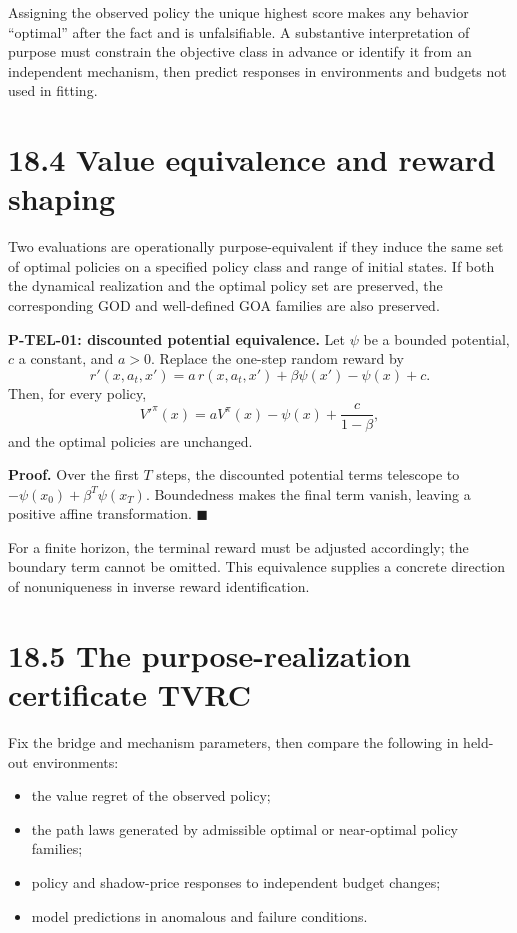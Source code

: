 \documentclass[
  english,
  11pt,
  oneside]{book}
\providecommand{\tightlist}{%
  \setlength{\itemsep}{0pt}\setlength{\parskip}{0pt}}
\begin{document}
Assigning the observed policy the unique highest score makes any behavior ``optimal'' after the fact and is unfalsifiable. A substantive interpretation of purpose must constrain the objective class in advance or identify it from an independent mechanism, then predict responses in environments and budgets not used in fitting.

\section{18.4 Value equivalence and reward shaping}\label{value-equivalence-and-reward-shaping}

Two evaluations are operationally purpose-equivalent if they induce the same set of optimal policies on a specified policy class and range of initial states. If both the dynamical realization and the optimal policy set are preserved, the corresponding GOD and well-defined GOA families are also preserved.

\hypertarget{p-tel-01}{}\label{p-tel-01}

\textbf{P-TEL-01: discounted potential equivalence.} Let \(\psi\) be a bounded potential, \(c\) a constant, and \(a>0\). Replace the one-step random reward by \[r'(x,a_t,x')=a\,r(x,a_t,x')+\beta\psi(x')-\psi(x)+c.\] Then, for every policy, \[V'^\pi(x)=aV^\pi(x)-\psi(x)+\frac c{1-\beta},\] and the optimal policies are unchanged.

\textbf{Proof.} Over the first \(T\) steps, the discounted potential terms telescope to \(-\psi(x_0)+\beta^T\psi(x_T)\). Boundedness makes the final term vanish, leaving a positive affine transformation. \(\blacksquare\)

For a finite horizon, the terminal reward must be adjusted accordingly; the boundary term cannot be omitted. This equivalence supplies a concrete direction of nonuniqueness in inverse reward identification.

\section{18.5 The purpose-realization certificate TVRC}\label{the-purpose-realization-certificate-tvrc}

Fix the bridge and mechanism parameters, then compare the following in held-out environments:

\begin{itemize}
\tightlist
\item
  the value regret of the observed policy;
\item
  the path laws generated by admissible optimal or near-optimal policy families;
\item
  policy and shadow-price responses to independent budget changes;
\item
  model predictions in anomalous and failure conditions.
\end{itemize}
\end{document}
